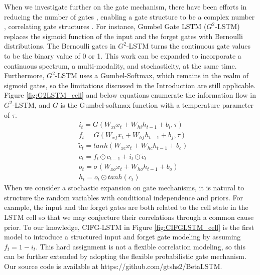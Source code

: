 \documentclass[letterpaper]{article} %
\begin{document}
When we investigate further on the gate mechanism, there have been efforts in reducing the number of gates \cite{sru}, enabling a gate structure to be a complex number \cite{NIPS2018_8253}, correlating gate structures \cite{greff2017lstm}.
For instance, Gumbel Gate LSTM ($G^{2}$-LSTM) \cite{li2018towards} replaces the sigmoid function of the input and the forget gates with Bernoulli distributions. The Bernoulli gates in $G^{2}$-LSTM turns the continuous gate values to be the binary value of 0 or 1.
This work can be expanded to incorporate a continuous spectrum, a multi-modality, and stochasticity, at the same time. Furthermore, $G^{2}$-LSTM uses a Gumbel-Softmax, which remains in the realm of sigmoid gates, so the limitations discussed in the Introduction are still applicable. Figure \ref{fig:G2LSTM_cell} and below equations enumerate the information flow in $G^{2}$-LSTM, and $G$ is the Gumbel-softmax function with a temperature parameter of $\tau$.
\begin{align}
	&i_{t} = G(W_{xi}x_{t}+W_{hi}h_{t-1}+b_{i},\tau) \\
	&f_{t} = G(W_{xf}x_{t}+W_{hf}h_{t-1}+b_{f},\tau) \\
	&\widetilde{c}_{t} = tanh(W_{xc}x_{t}+W_{hc}h_{t-1}+b_{c}) \\
	&c_{t} = f_{t} \odot c_{t-1} + i_{t} \odot \widetilde{c}_{t} \label{eq:G2_ct}\\
	&o_{t} = \sigma(W_{xo}x_{t}+W_{ho}h_{t-1}+b_{o}) \\
	&h_{t} = o_{t} \odot tanh(c_{t})
\end{align}
When we consider a stochastic expansion on gate mechanisms, it is natural to structure the random variables with conditional independence and priors. For example, the input and the forget gates are both related to the cell state in the LSTM cell so that we may conjecture their correlations through a common cause prior. To our knowledge, CIFG-LSTM in Figure \ref{fig:CIFGLSTM_cell} is the first model to introduce a structured input and forget gate modeling by assuming $f_{t}=1-i_{t}$. This hard assignment is not a flexible correlation modeling, so this can be further extended by adopting the flexible probabilistic gate mechanism. Our source code is available at https://github.com/gtshs2/BetaLSTM.
\end{document}
